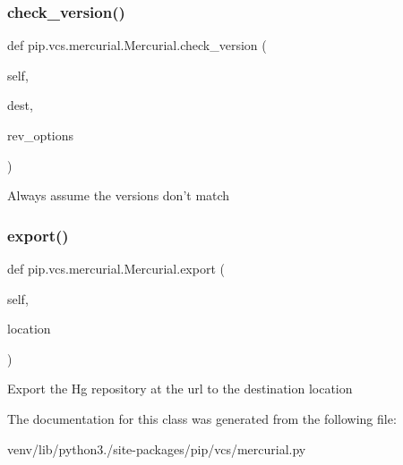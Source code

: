 \subsubsection{\texorpdfstring{check\+\_\+version()}{check\_version()}}
{\footnotesize\ttfamily def pip.\+vcs.\+mercurial.\+Mercurial.\+check\+\_\+version (\begin{DoxyParamCaption}\item[{}]{self,  }\item[{}]{dest,  }\item[{}]{rev\+\_\+options }\end{DoxyParamCaption})}

\begin{DoxyVerb}Always assume the versions don't match\end{DoxyVerb}
 \mbox{\label{classpip_1_1vcs_1_1mercurial_1_1_mercurial_ab3c1eb75424a06c6e8b119eb2507c31c}} 
\subsubsection{\texorpdfstring{export()}{export()}}
{\footnotesize\ttfamily def pip.\+vcs.\+mercurial.\+Mercurial.\+export (\begin{DoxyParamCaption}\item[{}]{self,  }\item[{}]{location }\end{DoxyParamCaption})}

\begin{DoxyVerb}Export the Hg repository at the url to the destination location\end{DoxyVerb}
 

The documentation for this class was generated from the following file\+:\begin{DoxyCompactItemize}
\item 
venv/lib/python3./site-\/packages/pip/vcs/mercurial.\+py\end{DoxyCompactItemize}
